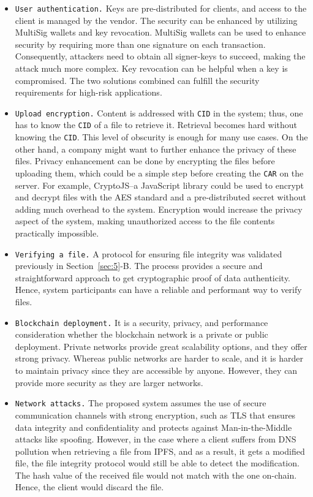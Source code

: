 \documentclass[conference]{IEEEtran}
\begin{document}
\begin{itemize}
    \item \texttt{User authentication.} Keys are pre-distributed for clients, and access to the client is managed by the vendor. The security can be enhanced by utilizing MultiSig wallets and key revocation. MultiSig wallets can be used to enhance security by requiring more than one signature on each transaction. Consequently, attackers need to obtain all signer-keys to succeed, making the attack much more complex. Key revocation can be helpful when a key is compromised. The two solutions combined can fulfill the security requirements for high-risk applications.
    \item \texttt{Upload encryption.} Content is addressed with \texttt{CID} in the system; thus, one has to know the \texttt{CID} of a file to retrieve it. Retrieval becomes hard without knowing the \texttt{CID}. This level of obscurity is enough for many use cases. On the other hand, a company might want to further enhance the privacy of these files. Privacy enhancement can be done by encrypting the files before uploading them, which could be a simple step before creating the \texttt{CAR} on the server. For example, CryptoJS--a JavaScript library  could be used to encrypt and decrypt files with the AES standard and a pre-distributed secret without adding much overhead to the system. Encryption would increase the privacy aspect of the system, making unauthorized access to the file contents practically impossible.
        
    \item \texttt{Verifying a file.} A protocol for ensuring file integrity was validated previously in Section~\ref{sec:5}-B. The process provides a secure and straightforward approach to get cryptographic proof of data authenticity. Hence, system participants can have a reliable and performant way to verify files.
        
    \item \texttt{Blockchain deployment.} It is a security, privacy, and performance consideration whether the blockchain network is a private or public deployment. Private networks provide great scalability options, and they offer strong privacy. Whereas public networks are harder to scale, and it is harder to maintain privacy since they are accessible by anyone. However, they can provide more security as they are larger networks.
        
    \item \texttt{Network attacks.} The proposed system assumes the use of secure communication channels with strong encryption, such as TLS that ensures data integrity and confidentiality and protects against Man-in-the-Middle attacks like spoofing. However, in the case where a client suffers from DNS pollution when retrieving a file from IPFS, and as a result, it gets a modified file, the file integrity protocol would still be able to detect the modification. The hash value of the received file would not match with the one on-chain. Hence, the client would discard the file.
\end{itemize}
\end{document}
